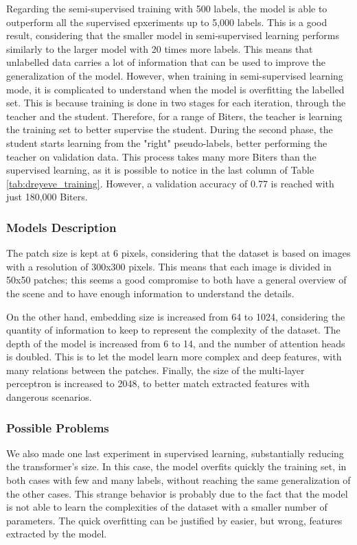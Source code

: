 Regarding the semi-supervised training with 500 labels, the model is able to 
outperform all the supervised epxeriments up to 5,000 labels. This is a good 
result, considering that the smaller model in semi-supervised learning performs 
similarly to the larger model with 20 times more labels. This means that 
unlabelled data carries a lot of information that can be used to improve the 
generalization of the model.
However, when training in semi-supervised learning mode, it is complicated 
to understand when the model is overfitting the labelled set. This is because 
training is done in two stages for each iteration, through the teacher and the 
student. Therefore, for a range of Biters, the teacher is learning the training 
set to better supervise the student. During the second phase, the student 
starts learning from the "right" pseudo-labels, better performing the teacher 
on validation data.
This process takes many more Biters than the supervised learning, as it is 
possible to notice in the last column of Table \ref{tab:dreyeve_training}.
However, a validation accuracy of 0.77 is reached with just 180,000 Biters.

\subsubsection{Models Description}
The patch size is kept at 6 pixels, considering that the dataset is based on 
images with a resolution of 300x300 pixels. This means that each image is 
divided in 50x50 patches; this seems a good compromise to both have a general 
overview of the scene and to have enough information to understand the details.

On the other hand, embedding size is increased from 64 to 1024, considering the 
quantity of information to keep to represent the complexity of the dataset.
The depth of the model is increased from 6 to 14, and the number of attention 
heads is doubled. This is to let the model learn more complex and deep features, 
with many relations between the patches. Finally, the size of the multi-layer
perceptron is increased to 2048, to better match extracted features with 
dangerous scenarios.


\subsubsection{Possible Problems}
We also made one last experiment in supervised learning, substantially reducing 
the transformer's size. In this case, the model overfits quickly the training 
set, in both cases with few and many labels, without reaching the same generalization of 
the other cases. This strange behavior is probably due to the fact that the 
model is not able to learn the complexities of the dataset with a smaller 
number of parameters. The quick overfitting can be justified by easier, but 
wrong, features extracted by the model.


